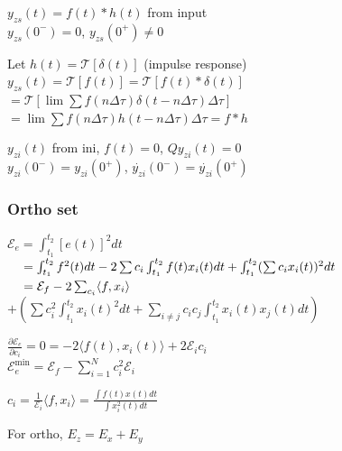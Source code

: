 \documentclass[4pt]{article}
\theoremstyle{definition}
\theoremstyle{definition}
\begin{document}
\begin{landscape}
\begin{multicols}{3}
    $y_{zs}(t) = f(t) * h(t)$ from input\\    
        $y_{zs}(0^-) = 0$, $y_{zs}(0^+) \neq 0$

        Let $h(t) = \mathcal{T} [\delta (t)]$ (impulse response)
            $y_{zs}(t)=\mathcal{T} [f(t)] = \mathcal{T} [f(t) * \delta (t)]$\\
            \hspace{2.75em}$=\mathcal{T}[\lim\sum f(n\Delta\tau) \delta(t - n\Delta\tau) \Delta\tau]$\\
            \hspace{2.75em}$=\lim\sum f(n\Delta\tau) h(t-n\Delta\tau)\Delta\tau = f * h$
            
        $y_{zi}(t)$ from ini, $f(t)=0$,
            $Q y_{zi}(t) = 0$\\
            $y_{zi}(0^-) = y_{zi}(0^+)$, $\dot{y_{zi}}(0^-) = \dot{y_{zi}}(0^+)$
\subsubsection*{Ortho set}
    $\mathcal{E}_e = \int_{t_1}^{t_2} [e(t)]^2 dt$\\
    $\hspace{1.25em}= \int_{t_1}^{t_2} f^2(t)dt - 2\sum c_i \int_{t_1}^{t_2} f(t) x_i(t) dt + \int_{t_1}^{t_2} (\sum c_i x_i(t))^2 dt$\\
    $\hspace{1.25em}   = \mathcal{E}_f -  2\sum_{c_i} \langle f, x_i \rangle$\\
    \hspace{2.25em}$+(\sum c_i^2 \int_{t_1}^{t_2} x_i(t)^2 dt + \sum_{i\neq j} c_i c_j \int_{t_1}^{t_2} x_i(t) x_j(t) dt)$
        
    $\frac{\partial \mathcal{E}_e}{\partial c_i} = 0 = -2 \langle f(t), x_i(t)\rangle + 2\mathcal{E}_i c_i$\\
    $\mathcal{E}_e^{\text{min}} = \mathcal{E}_f - \sum_{i=1}^N c_i^2 \mathcal{E}_i$

    \(c_i = \frac{1}{\mathcal{E}_i}\langle f, x_i\rangle = \frac{\int f(t) x(t) dt}{\int x_i^2(t) dt}\)    

    For ortho, $E_z = E_x + E_y$
        


\end{multicols}
\end{landscape}
\end{document}
